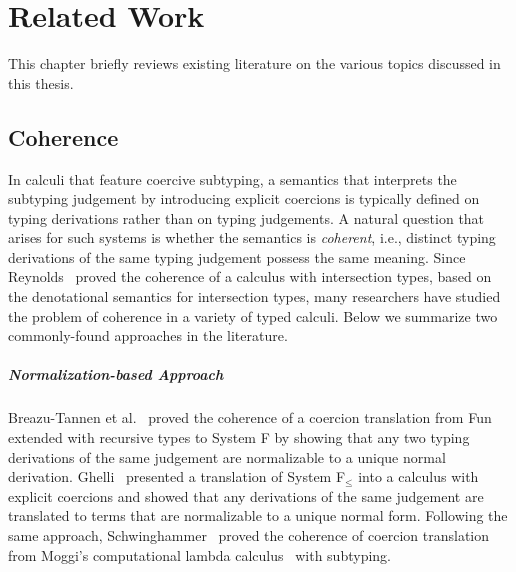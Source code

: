 
\chapter{Related Work}
\label{sec:related}

This chapter briefly reviews existing literature on the various topics discussed
in this thesis.


\section{Coherence}

In calculi that feature coercive subtyping, a semantics that interprets the
subtyping judgement by introducing explicit coercions is typically defined on
typing derivations rather than on typing judgements. A natural
question that arises
for such systems is whether the semantics is \textit{coherent}, i.e.,
distinct typing derivations of the same typing judgement possess the same
meaning. Since Reynolds~\citep{Reynolds_1991} proved the coherence of a calculus with
intersection types, based on the denotational semantics for intersection types,
many researchers have studied the problem of coherence in a variety of typed
calculi. Below we summarize two commonly-found approaches in the literature.

\paragraph{Normalization-based Approach}
Breazu-Tannen et al.~\citep{Breazu_Tannen_1991} proved
the coherence of a coercion translation from Fun~\citep{cardelli1985understanding}
extended with recursive types to System F by showing that any two
typing derivations of the same judgement are normalizable to a unique
normal derivation. %
Ghelli~\citep{Curien_1992} presented a translation of System F$_\leq$ into a calculus
with explicit coercions and showed that any derivations of the same judgement are
translated to terms that are normalizable to a unique normal form. Following the
same approach, Schwinghammer~\citep{SCHWINGHAMMER_2008} proved the coherence of coercion
translation from Moggi's computational lambda calculus~\citep{Moggi_1991} with subtyping.


